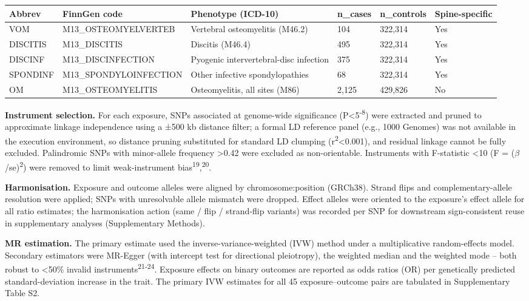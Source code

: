 \documentclass[11pt]{article}
\begin{document}
\begin{table}[ht]\centering
\begin{tabular}{llllll}
\toprule
Abbrev & FinnGen code & Phenotype (ICD-10) & n\_cases & n\_controls & Spine-specific \\
\midrule
VOM & M13\_OSTEOMYELVERTEB & Vertebral osteomyelitis (M46.2) & 104 & 322,314 & Yes \\
DISCITIS & M13\_DISCITIS & Discitis (M46.4) & 495 & 322,314 & Yes \\
DISCINF & M13\_DISCINFECTION & Pyogenic intervertebral-disc infection & 375 & 322,314 & Yes \\
SPONDINF & M13\_SPONDYLOINFECTION & Other infective spondylopathies & 68 & 322,314 & Yes \\
OM & M13\_OSTEOMYELITIS & Osteomyelitis, all sites (M86) & 2,125 & 429,826 & No \\
\bottomrule
\end{tabular}
\end{table}
\textbf{Instrument selection.} For each exposure, SNPs associated at genome-wide significance (P<5\textsuperscript{-8}) were extracted and pruned to approximate linkage independence using a ±500 kb distance filter; a formal LD reference panel (e.g., 1000 Genomes) was not available in the execution environment, so distance pruning substituted for standard LD clumping (r\textsuperscript{2}<0.001), and residual linkage cannot be fully excluded. Palindromic SNPs with minor-allele frequency >0.42 were excluded as non-orientable. Instruments with F-statistic <10 (F = ($\beta$/se)\textsuperscript{2}) were removed to limit weak-instrument bias\textsuperscript{19},\textsuperscript{20}.

\textbf{Harmonisation.} Exposure and outcome alleles were aligned by chromosome:position (GRCh38). Strand flips and complementary-allele resolution were applied; SNPs with unresolvable allele mismatch were dropped. Effect alleles were oriented to the exposure's effect allele for all ratio estimates; the harmonisation action (same / flip / strand-flip variants) was recorded per SNP for downstream sign-consistent reuse in supplementary analyses (Supplementary Methods).

\textbf{MR estimation.} The primary estimate used the inverse-variance-weighted (IVW) method under a multiplicative random-effects model. Secondary estimators were MR-Egger (with intercept test for directional pleiotropy), the weighted median and the weighted mode -- both robust to <50\% invalid instruments\textsuperscript{21-24}. Exposure effects on binary outcomes are reported as odds ratios (OR) per genetically predicted standard-deviation increase in the trait. The primary IVW estimates for all 45 exposure--outcome pairs are tabulated in Supplementary Table S2.
\end{document}
